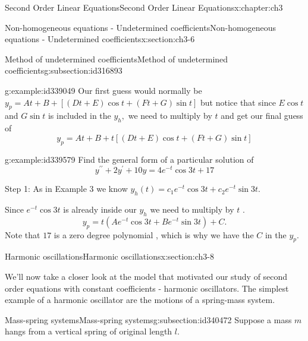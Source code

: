 \documentclass[oneside,10pt,]{book}
\numberwithin{equation}{section}
\numberwithin{equation}{section}
\begin{document}
\begin{chapterptx}{Second Order Linear Equations}{}{Second Order Linear Equations}{}{}{x:chapter:ch3}
\begin{sectionptx}{Non-homogeneous equations - Undetermined coefficients}{}{Non-homogeneous equations - Undetermined coefficients}{}{}{x:section:ch3-6}
\begin{subsectionptx}{Method of undetermined coefficients}{}{Method of undetermined coefficients}{}{}{g:subsection:id316893}
\begin{example}{}{g:example:id339049}
Our first guess would normally be \(y_{p}=At+B+\left[\left(Dt+E\right)\cos t+\left(Ft+G\right)\sin t\right]\) but notice that since \(E\cos t\) and \(G\sin t\) is included in the \(y_{h},\) we need to multiply by \(t\) and get our final guess of%
\begin{equation*}
y_{p}=At+B+t\left[\left(Dt+E\right)\cos t+\left(Ft+G\right)\sin t\right]
\end{equation*}
%
\end{example}
\begin{example}{}{g:example:id339579}%
Find the general form of a particular solution of%
\begin{equation*}
y^{\prime\prime}+2y^{\prime}+10y=4e^{-t}\cos3t+17
\end{equation*}
%
\par
Step 1: As in Example 3 we know \(y_{h}(t)=c_{1}e^{-t}\cos3t+c_{2}e^{-t}\sin3t.\)%
\par
Since \(e^{-t}\cos3t\) is already inside our \(y_{h}\) we need to multiply by \(t\) .%
\begin{equation*}
y_{p}=t\left(Ae^{-t}\cos3t+Be^{-t}\sin3t\right)+C.
\end{equation*}
Note that \(17\) is a zero degree polynomial , which is why we have the \(C\) in the \(y_{p}\).%
\end{example}
\end{subsectionptx}
\end{sectionptx}
%
%
\typeout{************************************************}
\typeout{************************************************}
%
\begin{sectionptx}{Harmonic oscillations}{}{Harmonic oscillations}{}{}{x:section:ch3-8}
\begin{introduction}{}%
We'll now take a closer look at the model that motivated our study of second order equations with constant coefficients - harmonic oscillators. The simplest example of a harmonic oscillator are the motions of a spring-mass system.%
\end{introduction}%
%
%
\typeout{************************************************}
\typeout{************************************************}
%
\begin{subsectionptx}{Mass-spring systems}{}{Mass-spring systems}{}{}{g:subsection:id340472}
Suppose a mass \(m\) hangs from a vertical spring of original length \(l\). \begin{sidebyside}{2}{0}{0}{0}%
\begin{sbspanel}{0.5}%

\end{sbspanel}
\end{sidebyside}
\end{subsectionptx}
\end{sectionptx}
\end{chapterptx}
\end{document}
